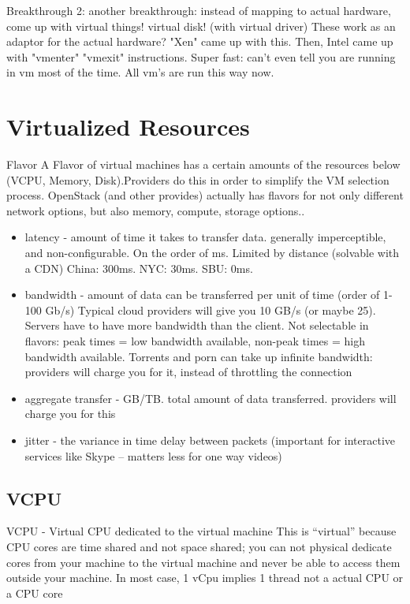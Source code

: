 \documentclass[fancy,11pt,titlestyle=display]{style/elegantbook}
\begin{document}
\par Breakthrough 2: another breakthrough: 
    instead of mapping to actual hardware, come up with virtual things! virtual disk! (with virtual driver) These work as an adaptor for the actual hardware? "Xen" came up with this. \newline
\vspace{5mm}    
    Then, Intel came up with "vmenter" "vmexit" instructions. Super fast: can't even tell you are running in vm most of the time. All vm's are run this way now.
    
\section{Virtualized Resources}


\begin{definition}{Flavor}{}
A Flavor of virtual machines has a certain amounts of the resources below (VCPU, Memory, Disk).Providers do this in order to simplify the VM selection process. OpenStack (and other provides) actually has flavors for not only different network options, but also memory, compute, storage options..
\end{definition}

\begin{itemize}
    \item latency - amount of time it takes to transfer data. generally imperceptible, and non-configurable. On the order of ms. Limited by distance (solvable with a CDN) China: 300ms. NYC: 30ms. SBU: 0ms.
    \item bandwidth - amount of data can be transferred per unit of time (order of 1-100 Gb/s) Typical cloud providers will give you 10 GB/s (or maybe 25). Servers have to have more bandwidth than the client. Not selectable in flavors: peak times = low bandwidth available, non-peak times = high bandwidth available. Torrents and porn can take up infinite bandwidth: providers will charge you for it, instead of throttling the connection
    \item aggregate transfer - GB/TB. total amount of data transferred. providers will charge you for this
    \item jitter - the variance in time delay between packets (important for interactive services like Skype -- matters less for one way videos)
\end{itemize}

\subsection*{VCPU}
VCPU - Virtual CPU dedicated to the virtual machine
This is ``virtual'' because CPU cores are time shared and not space shared; you can not physical dedicate cores from your machine to the virtual machine and never be able to access them outside your machine. In most case, 1 vCpu implies 1 thread not a actual CPU or a CPU core
\end{document}
